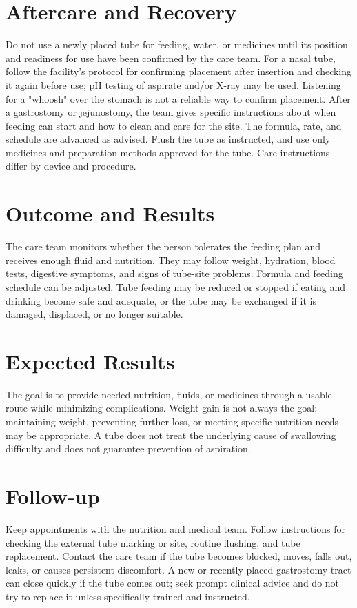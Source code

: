 \section*{Aftercare and Recovery}
Do not use a newly placed tube for feeding, water, or medicines until its position and readiness for use have been confirmed by the care team. For a nasal tube, follow the facility's protocol for confirming placement after insertion and checking it again before use; pH testing of aspirate and/or X-ray may be used. Listening for a "whoosh" over the stomach is not a reliable way to confirm placement. After a gastrostomy or jejunostomy, the team gives specific instructions about when feeding can start and how to clean and care for the site. The formula, rate, and schedule are advanced as advised. Flush the tube as instructed, and use only medicines and preparation methods approved for the tube. Care instructions differ by device and procedure.

\section*{Outcome and Results}
The care team monitors whether the person tolerates the feeding plan and receives enough fluid and nutrition. They may follow weight, hydration, blood tests, digestive symptoms, and signs of tube-site problems. Formula and feeding schedule can be adjusted. Tube feeding may be reduced or stopped if eating and drinking become safe and adequate, or the tube may be exchanged if it is damaged, displaced, or no longer suitable.

\section*{Expected Results}
The goal is to provide needed nutrition, fluids, or medicines through a usable route while minimizing complications. Weight gain is not always the goal; maintaining weight, preventing further loss, or meeting specific nutrition needs may be appropriate. A tube does not treat the underlying cause of swallowing difficulty and does not guarantee prevention of aspiration.

\section*{Follow-up}
Keep appointments with the nutrition and medical team. Follow instructions for checking the external tube marking or site, routine flushing, and tube replacement. Contact the care team if the tube becomes blocked, moves, falls out, leaks, or causes persistent discomfort. A new or recently placed gastrostomy tract can close quickly if the tube comes out; seek prompt clinical advice and do not try to replace it unless specifically trained and instructed.

